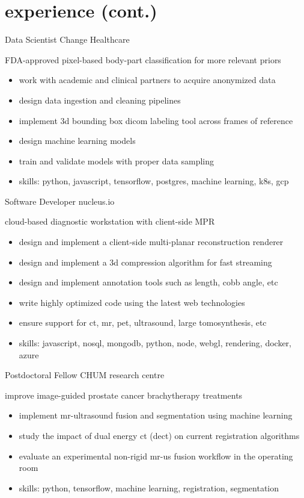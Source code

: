 \documentclass[print]{friggeri-cv}
\begin{document}
\section{experience (cont.)}
\begin{entrylist}
  {Data Scientist} {Change Healthcare}
  {FDA-approved pixel-based body-part classification for more relevant priors
  \begin{itemize}
    \item work with academic and clinical partners to acquire anonymized data
    \item design data ingestion and cleaning pipelines
    \item implement 3d bounding box dicom labeling tool across frames of reference
    \item design machine learning models
    \item train and validate models with proper data sampling
    \item skills: python, javascript, tensorflow, postgres, machine learning, k8s, gcp
  \end{itemize}}

  {Software Developer} {nucleus.io}
  {cloud-based diagnostic workstation with client-side {\small MPR}
  \begin{itemize}
    \item design and implement a client-side multi-planar reconstruction renderer
    \item design and implement a 3d compression algorithm for fast streaming
    \item design and implement annotation tools such as length, cobb angle, etc
    \item write highly optimized code using the latest web technologies
    \item ensure support for ct, mr, pet, ultrasound, large tomosynthesis, etc
    \item skills: javascript, nosql, mongodb, python, node, webgl, rendering, docker, azure
  \end{itemize}}

  {Postdoctoral Fellow}
  {CHUM research centre}
  {improve image-guided prostate cancer brachytherapy treatments
  \begin{itemize}
    \item implement mr-ultrasound fusion and segmentation using machine learning
    \item study the impact of dual energy ct (dect) on current registration algorithms
    \item evaluate an experimental non-rigid mr-us fusion workflow in the operating room
    \item skills: python, tensorflow, machine learning, registration, segmentation
  \end{itemize}}


\end{entrylist}
\end{document}
